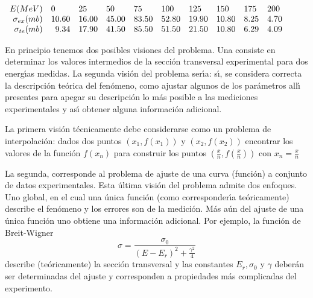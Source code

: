 \documentclass[spanish,titlepage,11pt]{article}
\begin{document}
\begin{center}
$%
\begin{array}
[c]{llllllllll}%
E(MeV) & 0 & 25 & 50 & 75 & 100 & 125 & 150 & 175 & 200\\
\multicolumn{1}{r}{\sigma_{ex}(mb)} & \multicolumn{1}{r}{10.60} &
\multicolumn{1}{r}{16.00} & \multicolumn{1}{r}{45.00} &
\multicolumn{1}{r}{83.50} & \multicolumn{1}{r}{52.80} &
\multicolumn{1}{r}{19.90} & \multicolumn{1}{r}{10.80} &
\multicolumn{1}{r}{8.25} & \multicolumn{1}{r}{4.70}\\
\multicolumn{1}{r}{\sigma_{te}(mb)} & \multicolumn{1}{r}{9.34} &
\multicolumn{1}{r}{17.90} & \multicolumn{1}{r}{41.50} &
\multicolumn{1}{r}{85.50} & \multicolumn{1}{r}{51.50} &
\multicolumn{1}{r}{21.50} & \multicolumn{1}{r}{10.80} &
\multicolumn{1}{r}{6.29} & \multicolumn{1}{r}{4.09}%
\end{array}
$
\end{center}

En principio tenemos dos posibles visiones del problema. Una consiste en
determinar los valores intermedios de la secci\'{o}n transversal experimental
para dos energ\'{\i}as medidas. La segunda visi\'{o}n del problema ser\'{\i}a:
s\'{\i}, se considera correcta la descripci\'{o}n te\'{o}rica del
fen\'{o}meno, como ajustar algunos de los par\'{a}metros all\'{\i} presentes
para apegar su descripci\'{o}n lo m\'{a}s posible a las mediciones
experimentales y as\'{\i} obtener alguna informaci\'{o}n adicional.

La primera visi\'{o}n t\'{e}cnicamente debe considerarse como un problema de
interpolaci\'{o}n: dados dos puntos $\left(  x_{1},f(x_{1})\right)  $ y
$\left(  x_{2},f(x_{2})\right)  $ encontrar los valores de la funci\'{o}n
$f(x_{n})$ para construir los puntos $\left(  \frac{x}{n},f\left(  \frac{x}%
{n}\right)  \right)  $ con $x_{n}=\frac{x}{n}$

La segunda, corresponde al problema de ajuste de una curva (funci\'{o}n) a
conjunto de datos experimentales. Esta \'{u}ltima visi\'{o}n del problema
admite dos enfoques. Uno global, en el cual una \'{u}nica funci\'{o}n (como
corresponder\'{\i}a te\'{o}ricamente) describe el fen\'{o}meno y los errores
son de la medici\'{o}n. M\'{a}s a\'{u}n del ajuste de una \'{u}nica
funci\'{o}n uno obtiene una informaci\'{o}n adicional. Por ejemplo, la
funci\'{o}n de Breit-Wigner
\begin{equation}
\sigma=\frac{\sigma_{0}}{\left(  E-E_{r}\right)  ^{2}+\frac{\gamma^{2}}{4}}%
\end{equation}
describe (te\'{o}ricamente) la secci\'{o}n transversal y las constantes
$E_{r},\sigma_{0}$ y $\gamma$ deber\'{a}n ser determinadas del ajuste y
corresponden a propiedades m\'{a}s complicadas del experimento.
\end{document}
